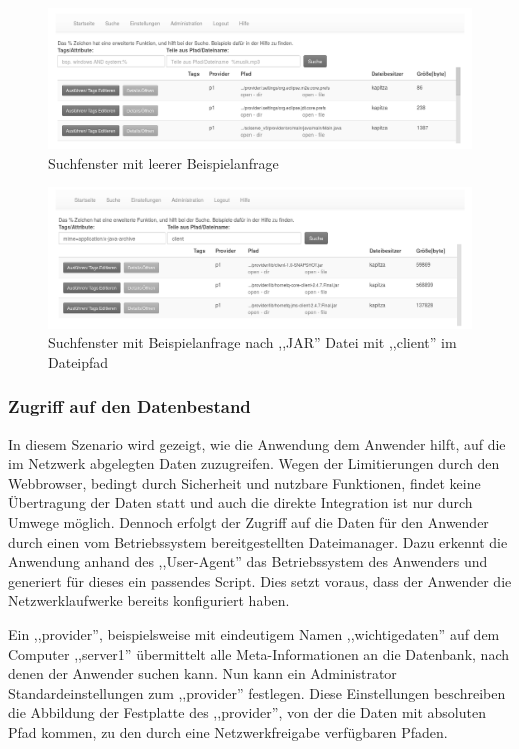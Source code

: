 \documentclass[oneside, ngerman, toc=bibliography,bibliography=totoc,listof=entryprefix, open=right,numbers=noenddot,fontsize=12pt]{scrbook}
\begin{document}
\begin{figure}[htbp] 
    \centering
    \includegraphics[width=\textwidth]{Masterarbeit_Bilder/www_suche.png}
    \caption{Suchfenster mit leerer Beispielanfrage}
    \label{fig:www-suche}
\end{figure}  

\begin{figure}[htbp] 
    \centering
    \includegraphics[width=\textwidth]{Masterarbeit_Bilder/www_suche2.png}
    \caption{Suchfenster mit Beispielanfrage nach ,,JAR'' Datei mit ,,client'' im Dateipfad}
    \label{fig:www-suche2}
\end{figure}  

 
\subsubsection{Zugriff auf den Datenbestand}
In diesem Szenario wird gezeigt, wie die Anwendung dem Anwender hilft, auf die im Netzwerk abgelegten Daten zuzugreifen. Wegen der Limitierungen durch den Webbrowser, bedingt durch Sicherheit und nutzbare Funktionen, findet keine Übertragung der Daten statt und auch die direkte Integration ist nur durch Umwege möglich.
Dennoch erfolgt der Zugriff auf die Daten für den Anwender  durch einen vom Betriebssystem bereitgestellten Dateimanager. 
Dazu erkennt die Anwendung anhand des ,,User-Agent'' das Betriebssystem des Anwenders und generiert für dieses ein passendes Script. Dies setzt voraus, dass der Anwender die Netzwerklaufwerke bereits konfiguriert haben.

Ein ,,provider'', beispielsweise mit eindeutigem Namen ,,wichtigedaten'' auf dem Computer ,,server1'' übermittelt alle Meta-Informationen an die Datenbank, nach denen der Anwender suchen kann. Nun kann ein Administrator Standardeinstellungen zum ,,provider'' festlegen. Diese Einstellungen beschreiben die Abbildung der Festplatte des ,,provider'', von der die Daten mit absoluten Pfad kommen, zu den durch eine Netzwerkfreigabe verfügbaren Pfaden.
\end{document}
